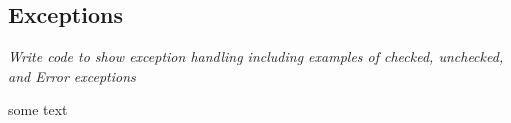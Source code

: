 \subsection{Exceptions}
\textit{Write code to show exception handling including examples of checked, unchecked, and Error exceptions}

some text

